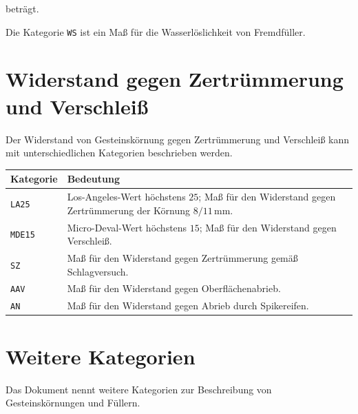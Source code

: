 \documentclass[
  12pt,
  a4paper,
  oneside
]{scrreprt}
\begin{document}
beträgt. 

Die Kategorie \texttt{WS} ist ein Maß für die Wasserlöslichkeit von
Fremdfüller. 

\section{Widerstand gegen Zertrümmerung und Verschleiß}

Der Widerstand von Gesteinskörnung gegen Zertrümmerung und Verschleiß
kann mit unterschiedlichen Kategorien beschrieben werden.


\begin{longtable}{
  >{\centering\arraybackslash}p{}
  >{\raggedright\arraybackslash}p{}
}
\toprule
\textbf{Kategorie} &
\textbf{Bedeutung} \\
\midrule
\endhead

\texttt{LA25} &
Los-Angeles-Wert höchstens $25$; Maß für den Widerstand gegen
Zertrümmerung der Körnung $8/11\,\mathrm{mm}$. \\

\texttt{MDE15} &
Micro-Deval-Wert höchstens $15$; Maß für den Widerstand gegen
Verschleiß. \\

\texttt{SZ} &
Maß für den Widerstand gegen Zertrümmerung gemäß Schlagversuch. \\

\texttt{AAV} &
Maß für den Widerstand gegen Oberflächenabrieb. \\

\texttt{AN} &
Maß für den Widerstand gegen Abrieb durch Spikereifen. \\

\bottomrule
\end{longtable}



\section{Weitere Kategorien}

Das Dokument nennt weitere Kategorien zur Beschreibung von
Gesteinskörnungen und Füllern.
\end{document}
